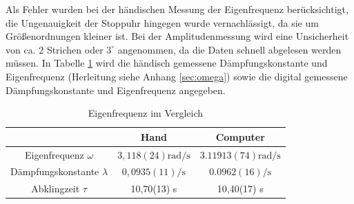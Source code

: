 \documentclass[11pt, a4paper]{article}
\begin{document}
    Als Fehler wurden bei der händischen Messung der Eigenfrequenz berücksichtigt, die Ungenauigkeit der Stoppuhr hingegen
    wurde vernachlässigt, da sie um Größenordnungen kleiner ist. Bei der Amplitudenmessung wird eine Unsicherheit von ca. 2 Strichen
    oder $3^{\circ}$ angenommen, da die Daten schnell abgelesen werden müssen.
    In Tabelle \ref{Tab:tableeig} wird die händisch gemessene Dämpfungskonstante und Eigenfrequenz (Herleitung siehe Anhang \ref{sec:omega}) sowie die
    digital gemessene Dämpfungskonstante und Eigenfrequenz angegeben. 
    \begin{table}[H]
        \centering
        \begin{tabular}{c c c} 
            & Hand & Computer \\ \hline
            Eigenfrequenz $\omega$ & $3,118(24) \si{\radian\per\second}$ & $3.11913(74) \si{\radian\per\second}$ \\
            Dämpfungskonstante $\lambda$ & $0,0935(11) \si{\per\second}$ & $0.0962(16) \si{\per\second}$ \\
            Abklingzeit $\tau$ & 10,70(13) \si{\second} & 10,40(17) \si{\second} \\

            
        \end{tabular}
        \caption{Eigenfrequenz im Vergleich}
        \label{Tab:tableeig}
    \end{table}
\end{document}
